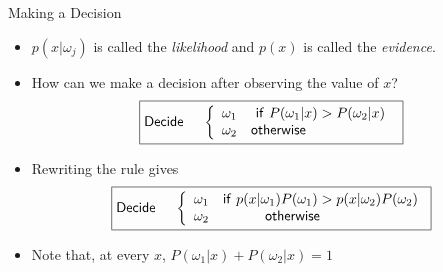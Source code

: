 \begin{frame}{Making a Decision}
\begin{itemize}
\item $p(x|\omega_j)$ is called the \textit{\color{mycolor1}likelihood} and $p(x)$ is called the \textit{\color{mycolor1}evidence}.
\item How can we make a decision after observing the value of $x$?
\begin{equation}
\boxed{{\sf Decide}~~~~\left\{ {\begin{array}{*{20}{c}}
{{\omega_1}}&{{\sf if}~P({\omega_1}|x) > P({\omega_2}|x)}\\
{{\omega_2}}&{\sf otherwise~~~~~~~~~~~~~~~~~~}
\end{array}} \right.\nonumber}
\end{equation}
\item Rewriting the rule gives
\begin{equation}
\boxed{{\sf Decide}~~~~\left\{ {\begin{array}{*{20}{c}}
{{\omega_1}}&{{\sf if}~{p(x|\omega_1)P(\omega_1)}>{p(x|\omega_2)P(\omega_2)}}\\
{{\omega_2}}&{\sf otherwise~~~~~~~~~~~~}
\end{array}} \right.\nonumber}
\end{equation}
\item Note that, at every $x$, $P(\omega_1|x)+P(\omega_2|x)=1$
\end{itemize}
\end{frame}
%
%
